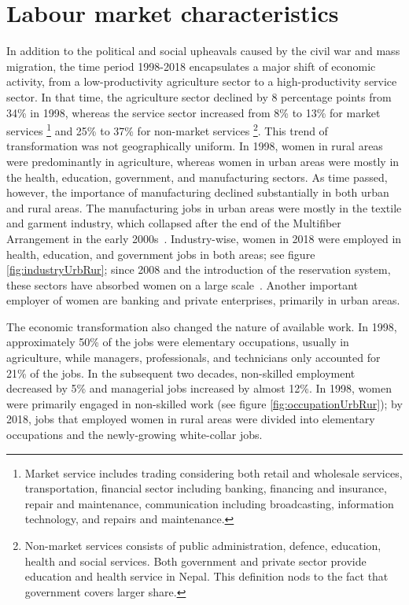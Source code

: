\section{Labour market characteristics} \label{isect3}

In addition to the political and social upheavals caused by the civil war and mass migration, the time period 1998-2018 encapsulates a major shift of economic activity, from a low-productivity agriculture sector to a high-productivity service sector. In that time, the agriculture sector declined by 8 percentage points from 34\% in 1998, whereas the service sector increased from 8\% to 13\% for market services \footnote{Market service includes trading considering both retail and wholesale services, transportation, financial sector including banking, financing and insurance, repair and maintenance, communication including broadcasting, information technology, and repairs and maintenance.} and 25\% to 37\% for non-market services \footnote{Non-market services consists of public administration, defence, education, health and social services. Both government and private sector provide education and health service in Nepal. This definition nods to the fact that government covers larger share.}. This trend of transformation was not geographically uniform. In 1998, women in rural areas were predominantly in agriculture, whereas women in urban areas were mostly in the health, education, government, and manufacturing sectors. As time passed, however, the importance of manufacturing declined substantially in both urban and rural areas. The manufacturing jobs in urban areas were mostly in the textile and garment industry, which collapsed after the end of the Multifiber Arrangement in the early 2000s~\citep{shakya2018death}. Industry-wise, women in 2018 were employed in health, education, and government jobs in both areas; see figure \ref{fig:industryUrbRur}; since 2008 and the introduction of the reservation system, these sectors have absorbed women on a large scale~\citep{Subedi2022}. Another important employer of women are banking and private enterprises, primarily in urban areas.\par   
	
The economic transformation also changed the nature of available work. In 1998, approximately 50\% of the jobs were elementary occupations, usually in agriculture, while managers, professionals, and technicians only accounted for 21\% of the jobs. In the subsequent two decades, non-skilled employment decreased by 5\% and managerial jobs increased by almost 12\%. In 1998, women were primarily engaged in non-skilled work (see figure \ref{fig:occupationUrbRur}); by 2018, jobs that employed women in rural areas were divided into elementary occupations and the newly-growing white-collar jobs.\par 

